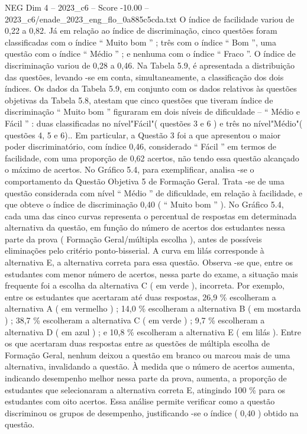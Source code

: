\begin{textsample}{NEG Dim 4 – 2023\_c6 – Score -10.00 – 2023\_c6/enade\_2023\_eng\_flo\_0a885c5cda.txt}
O índice de facilidade variou de 0,22 a 0,82.
Já em relação ao índice de discriminação, cinco questões foram classificadas com o índice “ Muito bom ” ; três com o índice “ Bom ”, uma questão com o índice “ Médio ” ; e nenhuma com o índice “ Fraco ”.
O índice de discriminação variou de 0,28 a 0,46.
Na Tabela 5.9, é apresentada a distribuição das questões, levando -se em conta, simultaneamente, a classificação dos dois índices.
Os dados da Tabela 5.9, em conjunto com os dados relativos às questões objetivas da Tabela 5.8, atestam que cinco questões que tiveram índice de discriminação “ Muito bom ” figuraram em dois níveis de dificuldade – “ Médio e Fácil ” : duas classificadas no nível"Fácil"( questões 3 e 6 ) e três no nível"Médio"( questões 4, 5 e 6)..
Em particular, a Questão 3 foi a que apresentou o maior poder discriminatório, com índice 0,46, considerado “ Fácil ” em termos de facilidade, com uma proporção de 0,62 acertos, não tendo essa questão alcançado o máximo de acertos.
No Gráfico 5.4, para exemplificar, analisa -se o comportamento da Questão Objetiva 5 de Formação Geral.
Trata -se de uma questão considerada com nível “ Médio ” de dificuldade, em relação à facilidade, e que obteve o índice de discriminação 0,40 ( “ Muito bom ” ).
No Gráfico 5.4, cada uma das cinco curvas representa o percentual de respostas em determinada alternativa da questão, em função do número de acertos dos estudantes nessa parte da prova ( Formação Geral/múltipla escolha ), antes de possíveis eliminações pelo critério ponto-bisserial.
A curva em lilás corresponde à alternativa E, a alternativa correta para essa questão.
Observa -se que, entre os estudantes com menor número de acertos, nessa parte do exame, a situação mais frequente foi a escolha da alternativa C ( em verde ), incorreta.
Por exemplo, entre os estudantes que acertaram até duas respostas, 26,9 \% escolheram a alternativa A ( em vermelho ) ; 14,0 \% escolheram a alternativa B ( em mostarda ) ; 38,7 \% escolheram a alternativa C ( em verde ) ; 9,7 \% escolheram a alternativa D ( em azul ) ; e 10,8 \% escolheram a alternativa E ( em lilás ).
Entre os que acertaram duas respostas entre as questões de múltipla escolha de Formação Geral, nenhum deixou a questão em branco ou marcou mais de uma alternativa, invalidando a questão.
À medida que o número de acertos aumenta, indicando desempenho melhor nessa parte da prova, aumenta, a proporção de estudantes que selecionaram a alternativa correta E, atingindo 100 \% para os estudantes com oito acertos.
Essa análise permite verificar como a questão discriminou os grupos de desempenho, justificando -se o índice ( 0,40 ) obtido na questão.

\end{textsample}
